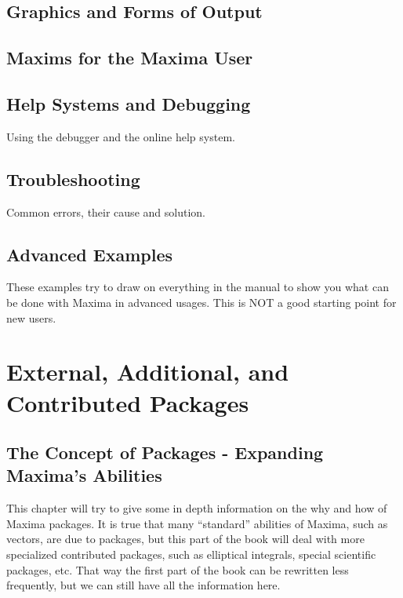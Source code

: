 \documentclass[oneside,english]{book}
\begin{document}
\chapter{Graphics and Forms of Output}

  

\chapter{Maxims for the Maxima User}
  

\chapter{Help Systems and Debugging}

    Using the debugger and the online help system.

\chapter{Troubleshooting}

    Common errors, their cause and solution.

\chapter{Advanced Examples}

    These examples try to draw on everything in the manual to show you
    what can be done with Maxima in advanced usages. 
    This is NOT a good starting point for new users.

   

\part{External, Additional, and Contributed Packages}


\chapter{The Concept of Packages - Expanding Maxima's Abilities}

    This chapter will try to give some in depth information on the why
    and how of Maxima packages. It is true that many {}``standard''
    abilities of Maxima, such as vectors, are due to packages, but this
    part of the book will deal with more specialized contributed packages,
    such as elliptical integrals, special scientific packages, etc. That
    way the first part of the book can be rewritten less frequently, but
    we can still have all the information here.
\end{document}
